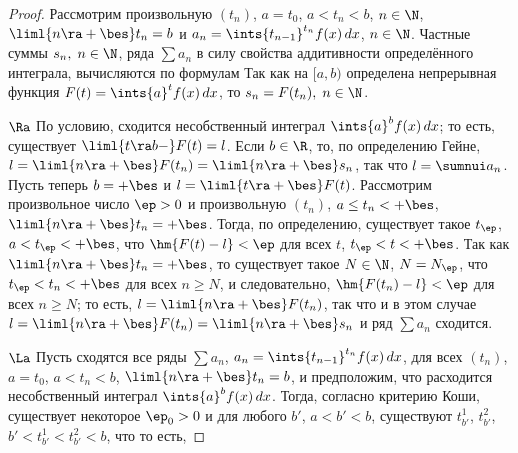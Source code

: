 \documentclass[a4paper]{article}
\begin{document}
\begin{proof}
Рассмотрим произвольную $(t_n)$, $a=t_0$, $a<t_n<b$, $n\in\N$,
$\liml{n\ra+\bes} t_n=b$ и $a_n = \ints{t_{n-1}}^{t_n} f(x)\,dx$,
$n\in\N$. Частные суммы $s_n, \; n\in\N$, ряда $\sum a_n$ в силу
свойства аддитивности определённого интеграла, вычисляются по
формулам  Так
как на $[a,b)$ определена непрерывная функция $F(t) = \ints{a}^t
f(x)\,dx$, то $s_n = F(t_n), \; n\in\N$.

$\Ra$ По условию, сходится несобственный интеграл $\ints{a}^b
f(x)\,dx$; то есть, существует $\liml{t\ra b-} F(t) = l$. Если
$b\in\R$, то, по определению Гейне, $l=\liml{n\ra+\bes} F(t_n) =
\liml{n\ra+\bes} s_n$, так что $l = \sumnui a_n$. Пусть теперь
$b=+\bes$ и $l=\liml{t\ra+\bes} F(t)$. Рассмотрим произвольное число
$\ep>0$ и произвольную $(t_n)$, $a\le t_n < +\bes$,
$\liml{n\ra+\bes} t_n = +\bes$. Тогда, по определению, существует
такое $t_{\ep}$, $a<t_{\ep}<+\bes$, что $\hm{F(t)-l}<\ep$ для всех
$t$, $t_{\ep}<t<+\bes$. Так как $\liml{n\ra+\bes} t_n = +\bes$, то
существует такое $N\in\N$, $N=N_{\ep}$, что $t_{\ep}<t_n < +\bes$
для всех $n\ge N$, и следовательно, $\hm{F(t_n)-l}<\ep$ для всех
$n\ge N$; то есть, $l = \liml{n\ra+\bes} F(t_n)$, так что и в этом
случае $l = \liml{n\ra+\bes} F(t_n) = \liml{n\ra+\bes} s_n$ и ряд
$\sum a_n$ сходится.

$\La$ Пусть сходятся все ряды $\sum a_n$, $a_n =
\ints{t_{n-1}}^{t_n} f(x)\,dx$, для всех $(t_n)$, $a=t_0$,
$a<t_n<b$, $\liml{n\ra+\bes} t_n=b$, и предположим, что расходится
несобственный интеграл $\ints{a}^b f(x)\,dx$. Тогда, согласно
критерию Коши, существует некоторое $\ep_0>0$ и для любого $b'$,
$a<b'<b$, существуют $t_{b'}^1$, $t_{b'}^2$,
$b'<t_{b'}^1<t_{b'}^2<b$, что  то есть, 


\end{proof}
\end{document}
